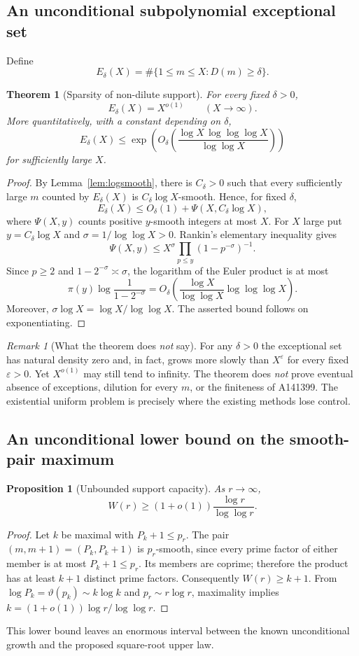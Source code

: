 \documentclass[11pt,letterpaper]{article}
\newtheorem{theorem}[conjecture]{Theorem}
\newtheorem{proposition}[conjecture]{Proposition}
\theoremstyle{remark}
\newtheorem{remark}[conjecture]{Remark}
\newcommand{\PsiSmooth}{\Psi}
\begin{document}
\subsection{An unconditional subpolynomial exceptional set}
Define
\[
E_\delta(X)=\#\{1\le m\le X:D(m)\ge\delta\}.
\]
\begin{theorem}[Sparsity of non-dilute support]\label{thm:sparse}
For every fixed $\delta>0$,
\[
\boxed{E_\delta(X)=X^{o(1)}\qquad (X\to\infty).}
\]
More quantitatively, with a constant depending on $\delta$,
\[
E_\delta(X)\le
\exp\left(O_\delta\!\left(
\frac{\log X\,\log\log\log X}{\log\log X}
\right)\right)
\]
for sufficiently large $X$.
\end{theorem}
\begin{proof}
By Lemma~\ref{lem:logsmooth}, there is $C_\delta>0$ such that every
sufficiently large $m$ counted by $E_\delta(X)$ is
$C_\delta\log X$-smooth. Hence, for fixed $\delta$,
\[
E_\delta(X)\le O_\delta(1)+\PsiSmooth(X,C_\delta\log X),
\]
where $\PsiSmooth(X,y)$ counts positive $y$-smooth integers at most $X$.
For $X$ large put $y=C_\delta\log X$ and
$\sigma=1/\log\log X>0$. Rankin's elementary inequality gives
\[
\PsiSmooth(X,y)
\le X^\sigma\prod_{p\le y}(1-p^{-\sigma})^{-1}.
\]
Since $p\ge2$ and $1-2^{-\sigma}\asymp\sigma$, the logarithm of the
Euler product is at most
\[
\pi(y)\log\frac{1}{1-2^{-\sigma}}
=O_\delta\left(
\frac{\log X}{\log\log X}\log\log\log X\right).
\]
Moreover, $\sigma\log X=\log X/\log\log X$. The asserted bound
follows on exponentiating.
\end{proof}

\begin{remark}[What the theorem does \emph{not} say]
For any $\delta>0$ the exceptional set has natural density zero and,
in fact, grows more slowly than $X^\varepsilon$ for every fixed
$\varepsilon>0$. Yet $X^{o(1)}$ may still tend to infinity. The theorem
does \emph{not} prove eventual absence of exceptions, dilution for every
$m$, or the finiteness of A141399. The existential uniform problem is
precisely where the existing methods lose control.
\end{remark}

\subsection{An unconditional lower bound on the smooth-pair maximum}
\begin{proposition}[Unbounded support capacity]\label{prop:lower}
As $r\to\infty$,
\[
\boxed{W(r)\ge(1+o(1))\frac{\log r}{\log\log r}.}
\]
\end{proposition}
\begin{proof}
Let $k$ be maximal with $P_k+1\le p_r$. The pair
$(m,m+1)=(P_k,P_k+1)$ is $p_r$-smooth, since every prime factor of
either member is at most $P_k+1\le p_r$. Its members are coprime;
therefore the product has at least $k+1$ distinct prime factors.
Consequently $W(r)\ge k+1$. From $\log P_k=\vartheta(p_k)
\sim k\log k$ and $p_r\sim r\log r$, maximality implies
$k=(1+o(1))\log r/\log\log r$.
\end{proof}
This lower bound leaves an enormous interval between the known
unconditional growth and the proposed square-root upper law.
\end{document}
